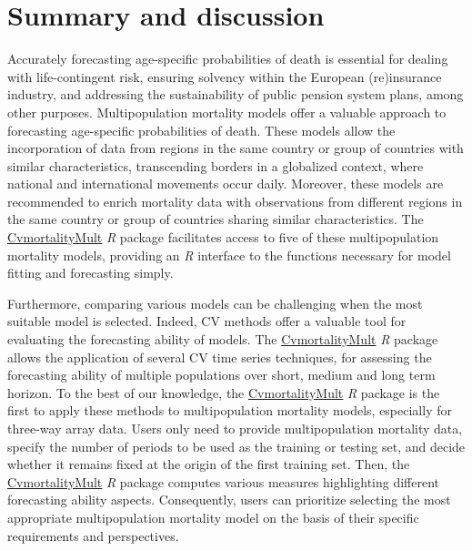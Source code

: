 \section{Summary and discussion} \label{sec:summary}

Accurately forecasting age-specific probabilities of death is essential for dealing with life-contingent risk, ensuring solvency within the European (re)insurance industry, and addressing the sustainability of public pension system plans, among other purposes. Multipopulation mortality models offer a valuable approach to forecasting age-specific probabilities of death. These models allow the incorporation of data from regions in the same country or group of countries with similar characteristics, transcending borders in a globalized context, where national and international movements occur daily. Moreover, these models are recommended to enrich mortality data with observations from different regions in the same country or group of countries sharing similar characteristics. The \href{https://cran.r-project.org/web/packages/CvmortalityMult/index.html}{CvmortalityMult} \emph{R} package facilitates access to five of these multipopulation mortality models, providing an \emph{R} interface to the functions necessary for model fitting and forecasting simply.

Furthermore, comparing various models can be challenging when the most suitable model is selected. Indeed, CV methods offer a valuable tool for evaluating the forecasting ability of models. The \href{https://cran.r-project.org/web/packages/CvmortalityMult/index.html}{CvmortalityMult} \emph{R} package allows the application of several CV time series techniques, for assessing the forecasting ability of multiple populations over short, medium and long term horizon. To the best of our knowledge, the \href{https://cran.r-project.org/web/packages/CvmortalityMult/index.html}{CvmortalityMult} \emph{R} package is the first to apply these methods to multipopulation mortality models, especially for three-way array data. Users only need to provide multipopulation mortality data, specify the number of periods to be used as the training or testing set, and decide whether it remains fixed at the origin of the first training set. Then, the \href{https://cran.r-project.org/web/packages/CvmortalityMult/index.html}{CvmortalityMult} \emph{R} package computes various measures highlighting different forecasting ability aspects. Consequently, users can prioritize selecting the most appropriate multipopulation mortality model on the basis of their specific requirements and perspectives.

